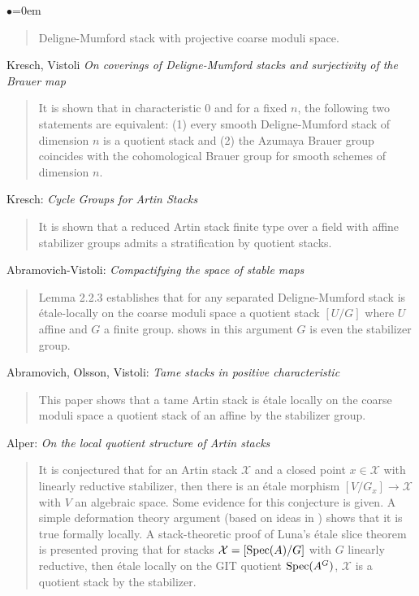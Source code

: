 \begin{list}{$\bullet$}{\leftmargin=0em}
\begin{quote}
Deligne-Mumford stack with projective coarse moduli space.
\end{quote}
\smallskip
\item
Kresch, Vistoli \emph{On coverings of Deligne-Mumford stacks and surjectivity 
of the Brauer map} \cite{kresch-vistoli}
\begin{quote}
It is shown that in characteristic 0 and for a fixed $n$, the following two 
statements are equivalent: (1) every smooth Deligne-Mumford stack of dimension 
$n$ is a quotient stack and (2) the Azumaya Brauer group coincides with the 
cohomological Brauer group for smooth schemes of dimension $n$.
\end{quote}
\smallskip
\item
Kresch: \emph{Cycle Groups for Artin Stacks} \cite{kresch_cycle}
\begin{quote}
It is shown that a reduced Artin stack finite type over a field with affine 
stabilizer groups admits a stratification by quotient stacks.
\end{quote}
\smallskip
\item Abramovich-Vistoli:
\emph{Compactifying the space of stable maps} \cite{abramovich-vistoli}
\begin{quote}
Lemma 2.2.3 establishes that for any separated Deligne-Mumford stack is 
\'etale-locally on the coarse moduli space a quotient stack $[U/G]$ where $U$ 
affine and $G$ a finite group. \cite[Theorem 2.12]{olsson_homstacks} shows in 
this argument $G$ is even the stabilizer group.
\end{quote}
\smallskip
\item Abramovich, Olsson, Vistoli:
\emph{Tame stacks in positive characteristic} \cite{tame}
\begin{quote}
This paper shows that a tame Artin stack is \'etale locally on the coarse 
moduli space a quotient stack of an affine by the stabilizer group.
\end{quote}
\smallskip
\item Alper: \emph{On the local quotient structure of Artin stacks} 
\cite{alper_quotient}
\begin{quote}
It is conjectured that for an Artin stack $\mathcal{X}$ and a closed point $x 
\in \mathcal{X}$ 
with linearly reductive stabilizer, then there is an \'etale morphism $[V/G_x] 
\to \mathcal{X}$ with $V$ an algebraic space. Some evidence for this 
conjecture is 
given. A simple deformation theory argument (based on ideas in \cite{tame}) 
shows that it is true formally locally. A stack-theoretic proof of Luna's 
\'etale slice theorem is presented proving that for stacks 
$\mathcal{X} = [\mathop{\rm Spec}(A)/G]$ 
with $G$ linearly reductive, then \'etale locally on the GIT quotient 
$\mathop{\rm Spec}(A^G)$, $\mathcal{X}$ is a quotient stack by the stabilizer. 
\end{quote}
\end{list}

